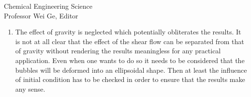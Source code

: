 \documentclass{letter}
\begin{document}
\begin{letter}{
Chemical Engineering Science\\
Professor Wei Ge, Editor\\}
\begin{enumerate}
Regarding the effect of $\lambda$ and $\eta$, ongoingly we are examining the effect of $\lambda$ and $\eta$ on drop breakup for following 
combinations of $\lambda$ and $\eta$:
\begin{tabbing}
 \hspace{55mm} \= \hspace{10mm} \kill
 \hspace{5mm} 1. $\lambda$ = 1.0, $\eta$ =1.0 (done) . $\lambda \simeq 0.0$, $\eta \simeq 0.0$ (this study) \\ 
 \hspace{5mm} 3. $\lambda$ = 1.0, $\eta \simeq 0.0$ (done) . $\lambda$ = 1.0, $\eta$ =0.01 \\
 \hspace{5mm} 5. $\lambda$ = 1.0, $\eta \simeq 0.1$ . $\lambda$ = 0.1, $\eta \simeq 0.0$ (done) \\
 \hspace{5mm} 7. $\lambda$ = 0.1, $\eta$ =0.01 . $\lambda = 0.1$, $\eta$ =0.1  \\
 \hspace{5mm} 9. $\lambda$ = 0.1, $\eta$ =1.0 (done) . $\lambda$ = 1.0, $\eta$ =10  \\
 \hspace{5mm} 11. $\lambda$ = 1.0, $\eta$ =100 . $\lambda$ = 1.0, $\eta$ =1000 \\
\end{tabbing}

Since it takes a very long computational time to obtain results for the effect of $\lambda$ and $\eta$ on drop deformation and breakup, 
all computations for these conditions have not been finished. We will also present the fruits of research on the effect of density and 
viscosity ratios in the next papers. \\
\\

\par\noindent
\item
\textsf
{The effect of gravity is neglected which potentially obliterates the results. It is not at all clear that the effect of the shear flow can be separated from that of gravity without rendering the results meaningless for any practical application. Even when one wants to do so it needs to be considered that the bubbles will be deformed into an ellipsoidal shape. Then at least the influence of initial condition has to be checked in order to ensure that the results make any sense. \\}
\vspace{3 mm}


\end{enumerate}
\end{letter}
\end{document}
